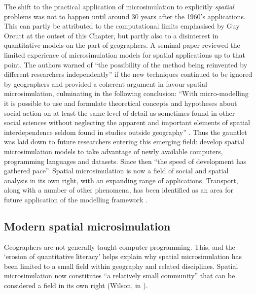 The shift to the practical application of microsimulation to explicitly
\emph{spatial} problems was not to happen until around 30 years after the
1960's applications. This can partly be attributed to the
computational limits emphasised by Guy Orcutt at the outset of this Chapter, but
partly also to a disinterest in quantitative models on the part of geographers.
A seminal paper \citep{Holm1987} reviewed the limited experience of
microsimulation models for
spatial applications up to that point. The authors warned of ``the
possibility of the method being reinvented by different
researchers independently'' if the new techniques continued to be ignored by
geographers \citep[p.~145]{Holm1987} and provided a coherent argument in favour
spatial microsimulation, culminating in the following conclusion:
``With micro-modelling it is possible to use and formulate theoretical concepts
and hypotheses about social action on at least the same level of detail as
sometimes found in other social sciences  without neglecting the apparent and
important elements of spatial interdependence seldom found in studies outside
geography'' \citep[p.~163]{Holm1987}.
Thus the gauntlet was laid down to future
researchers entering this emerging field: develop spatial microsimulation models
to take advantage of newly available computers, programming languages and
datasets. Since then ``the speed of development has gathered
pace''\citep[p.~259]{clarke2013conclusions}. Spatial microsimulation is now a
field of social and spatial analysis in its own right, with an expanding range
of applications. Transport, along with a number of other phenomena, has been
identified as an area for future application of the modelling framework
\citep[p.~270]{clarke2013conclusions}.

\subsection{Modern spatial microsimulation}

Geographers are not generally taught computer programming.
This, and the `erosion of quantitative literacy' \citep{ESRC2013}
helps explain why spatial microsimulation has been limited to a
small field within geography and related disciplines. Spatial
microsimulation now constitutes ``a relatively small
community'' that can be considered a field in its own right
(Wilson, in \citealp[p.~vi]{Tanton2013}).

